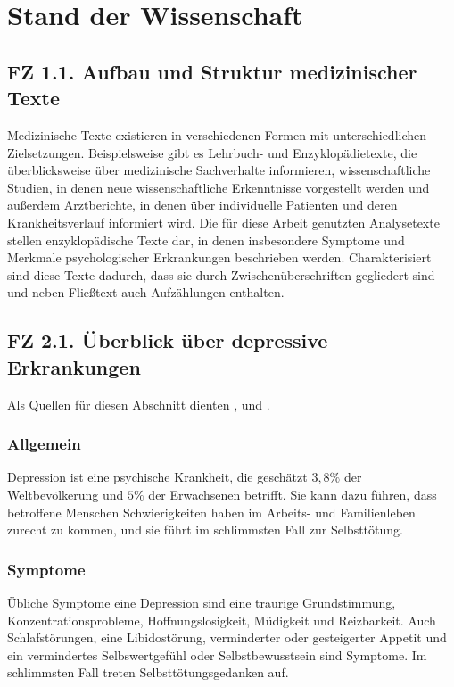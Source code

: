\chapter{Stand der Wissenschaft}
\label{ch:standderwissenschaft} 


%
%
\section{FZ 1.1. Aufbau und Struktur medizinischer Texte}
\label{sec:fz1.1.} 

Medizinische Texte existieren in verschiedenen Formen mit unterschiedlichen Zielsetzungen. Beispielsweise gibt es Lehrbuch- und Enzyklopädietexte, die überblicksweise über medizinische Sachverhalte informieren, wissenschaftliche Studien, in denen neue wissenschaftliche Erkenntnisse vorgestellt werden und außerdem Arztberichte, in denen über individuelle Patienten und deren Krankheitsverlauf informiert wird.
Die für diese Arbeit genutzten Analysetexte stellen enzyklopädische Texte dar, in denen insbesondere Symptome und Merkmale psychologischer Erkrankungen beschrieben werden.
Charakterisiert sind diese Texte dadurch, dass sie durch Zwischenüberschriften gegliedert sind und neben Fließtext auch Aufzählungen enthalten.


%
%
\section{FZ 2.1. Überblick über depressive Erkrankungen}
\label{sec:fz2.1.} 
Als Quellen für diesen Abschnitt dienten \cite{mpg_depression}, \cite{who_depression} und \cite{psychrembel_depression}.
\subsection{Allgemein}
Depression ist eine psychische Krankheit, die geschätzt $3,8 \%$ der Weltbevölkerung und $5\%$ der Erwachsenen betrifft.
Sie kann dazu führen, dass betroffene Menschen Schwierigkeiten haben im Arbeits- und Familienleben zurecht zu
kommen, und sie führt im schlimmsten Fall zur Selbsttötung.

\subsection{Symptome}
Übliche Symptome eine Depression sind eine traurige Grundstimmung, Konzentrationsprobleme, Hoffnungslosigkeit, 
Müdigkeit und Reizbarkeit. Auch Schlafstörungen, eine Libidostörung, verminderter oder gesteigerter Appetit und
ein vermindertes Selbswertgefühl oder Selbstbewusstsein sind Symptome. Im schlimmsten Fall treten 
Selbsttötungsgedanken auf.

